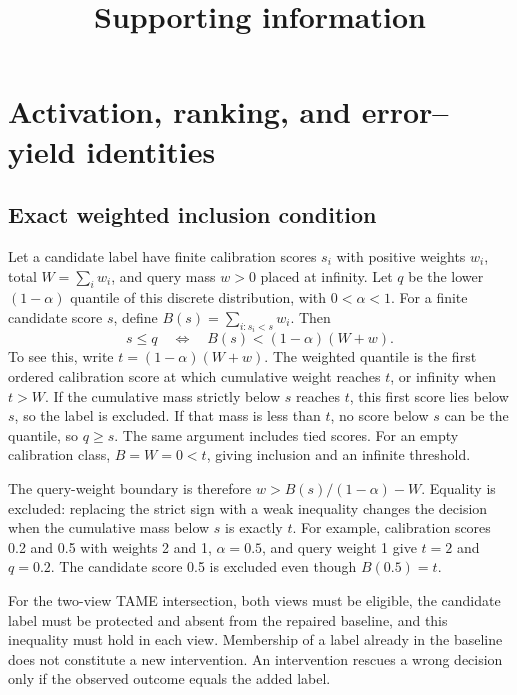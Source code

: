 
\renewcommand{\thesection}{S\arabic{section}}
\renewcommand{\thetable}{S\arabic{table}}
\renewcommand{\theequation}{S\arabic{equation}}
\title{Supporting information\\\large\papertitle}
\author{\jointauthors}
\date{}
\maketitle
\section{Activation, ranking, and error--yield identities}
\subsection{Exact weighted inclusion condition}
Let a candidate label have finite calibration scores $s_i$ with positive weights $w_i$, total $W=\sum_iw_i$, and query mass $w>0$ placed at infinity. Let $q$ be the lower $(1-\alpha)$ quantile of this discrete distribution, with $0<\alpha<1$. For a finite candidate score $s$, define $B(s)=\sum_{i:s_i<s}w_i$. Then
\begin{equation}
s\le q\quad\Longleftrightarrow\quad B(s)<(1-\alpha)(W+w).
\end{equation}
To see this, write $t=(1-\alpha)(W+w)$. The weighted quantile is the first ordered calibration score at which cumulative weight reaches $t$, or infinity when $t>W$. If the cumulative mass strictly below $s$ reaches $t$, this first score lies below $s$, so the label is excluded. If that mass is less than $t$, no score below $s$ can be the quantile, so $q\ge s$. The same argument includes tied scores. For an empty calibration class, $B=W=0<t$, giving inclusion and an infinite threshold.

The query-weight boundary is therefore $w>B(s)/(1-\alpha)-W$. Equality is excluded: replacing the strict sign with a weak inequality changes the decision when the cumulative mass below $s$ is exactly $t$. For example, calibration scores 0.2 and 0.5 with weights 2 and 1, $\alpha=0.5$, and query weight 1 give $t=2$ and $q=0.2$. The candidate score 0.5 is excluded even though $B(0.5)=t$.

For the two-view TAME intersection, both views must be eligible, the candidate label must be protected and absent from the repaired baseline, and this inequality must hold in each view. Membership of a label already in the baseline does not constitute a new intervention. An intervention rescues a wrong decision only if the observed outcome equals the added label.

